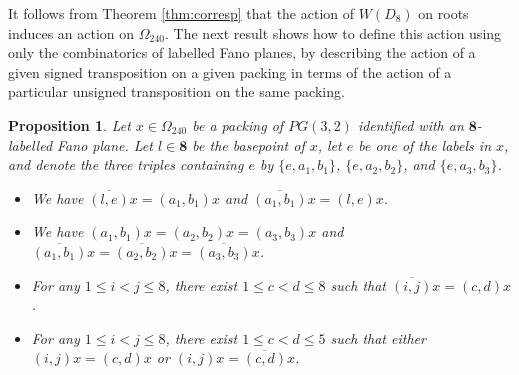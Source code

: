 \documentclass{amsart}
\theoremstyle{plain}
\newtheorem{prop}[theorem]{Proposition}
\theoremstyle{definition}
\theoremstyle{remark}
\numberwithin{equation}{section}
\newcommand{\eight}{{\mathbf 8}}
\newcommand{\qpx}{\Omega_{240}}
\begin{document}
It follows from Theorem \ref{thm:corresp} that the action of $W(D_8)$ on roots induces an action on $\qpx$. The 
next result shows how to define this action using only the combinatorics of labelled Fano planes, by describing 
the action of a given signed transposition on a given packing in terms of the action of a particular unsigned
transposition on the same packing.

\begin{prop}\label{prop:signact}
Let $x \in \qpx$ be a packing of $PG(3, 2)$ identified with an $\eight$-labelled Fano plane. Let $l \in \eight$ 
be the basepoint of $x$, let $e$ be one of the labels in $x$, and denote the three triples containing
$e$ by $\{e, a_1, b_1\}$, $\{e, a_2, b_2\}$, and $\{e, a_3, b_3\}$. 
\begin{itemize}
\item[{\rm (i)}]{We have $\overline{(l, e)}x = (a_1, b_1)x$ and $\overline{(a_1, b_1)}x = (l, e)x$.}
\item[{\rm (ii)}]{We have $(a_1, b_1)x = (a_2, b_2)x = (a_3, b_3)x$ and
$\overline{(a_1, b_1)}x = \overline{(a_2, b_2)}x = \overline{(a_3, b_3)}x$.}
\item[{\rm (iii)}]{For any $1 \leq i < j \leq 8$, there exist $1 \leq c < d \leq 8$ such that
$\overline{(i, j)}x = (c, d)x$.}
\item[{\rm (iv)}]{For any $1 \leq i < j \leq 8$, there exist $1 \leq c < d \leq 5$ such that either
$(i, j)x = (c, d)x$ or $(i, j)x = \overline{(c, d)}x$.}
\end{itemize}
\end{prop}
\end{document}
